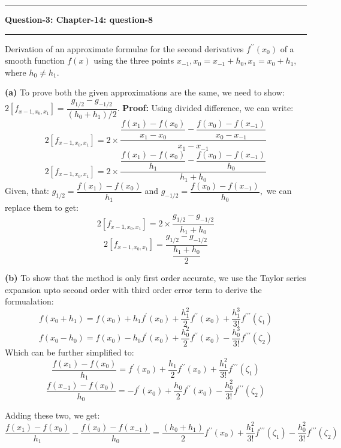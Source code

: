 \documentclass{article}
\newcommand\question[2]{\vspace{.25in}\hrule\textbf{#1: #2}\hrule\vspace{.10in}}
\renewcommand\part[1]{\vspace{.10in}\textbf{(#1)}}
\begin{document}
  \question{Question-3}{Chapter-14: question-8}
  Derivation of an approximate formulae for the second derivatives $f^{\prime\prime}(x_0)$ of a smooth function $f(x)$ using the three points $x_{-1},x_0 = x_{-1} + h_0, x_1=x_0 + h_1$, where $h_0 \neq h_1$. 

  \part{a} To prove both the given approximations are the same, we need to show: $2[f_{x-1,x_0,x_1}] = \dfrac{g_{1/2} - g_{-1/2}}{(h_0+h_1)/2}$. \newline
  \textbf {Proof:} \newline
  Using divided difference, we can write:
  \[2[f_{x-1,x_0,x_1}] = 2 \times \dfrac{\dfrac{f(x_1)-f(x_0)}{x_1 - x_0}-\dfrac{f(x_0) - f(x_{-1})}{x_0 - x_{-1}}}{x_1 - x_{-1}}\]
  \[2[f_{x-1,x_0,x_1}] = 2 \times \dfrac{\dfrac{f(x_1)-f(x_0)}{h_1}-\dfrac{f(x_0) - f(x_{-1})}{h_0}}{h_1 + h_0}\]
  Given, that: $g_{1/2} = \dfrac{f(x_1)-f(x_0)}{h_1}$ and $g_{-1/2} = \dfrac{f(x_0) - f(x_{-1})}{h_0},$ we can replace them to get:
  \[2[f_{x-1,x_0,x_1}] = 2 \times \dfrac{g_{1/2}-g_{-1/2}}{h_1 + h_0}\]
  \[2[f_{x-1,x_0,x_1}] = \dfrac{g_{1/2}-g_{-1/2}}{\dfrac{h_1 + h_0}{2}}\]

  \part{b} To show that the method is only first order accurate, we use the Taylor series expansion upto second order with third order error term to derive the formualation:\newline
  \[f(x_0 + h_1) = f(x_0) + h_1f^\prime(x_0) + \dfrac{h_1^2}{2}f^{\prime\prime}(x_0) + \dfrac{h_1^3}{3!}f^{\prime\prime\prime}(\zeta_1)\]
  \[f(x_0 - h_0) = f(x_0) - h_0f^\prime(x_0) + \dfrac{h_0^2}{2}f^{\prime\prime}(x_0) - \dfrac{h_0^3}{3!}f^{\prime\prime\prime}(\zeta_2)\]
  Which can be further simplified to:
  \[\dfrac{f(x_1) - f(x_0)}{h_1} =  f^\prime(x_0) + \dfrac{h_1}{2}f^{\prime\prime}(x_0) + \dfrac{h_1^2}{3!}f^{\prime\prime\prime}(\zeta_1)\]
  \[\dfrac{f(x_{-1}) - f(x_0)}{h_0} = -f^\prime(x_0) + \dfrac{h_0}{2}f^{\prime\prime}(x_0) - \dfrac{h_0^2}{3!}f^{\prime\prime\prime}(\zeta_2)\]

  Adding these two, we get:
  \[\dfrac{f(x_1) - f(x_0)}{h_1} - \dfrac{f(x_{0}) - f(x_{-1})}{h_0} = \dfrac{(h_0 + h_1)}{2}f^{\prime\prime}(x_0) + \dfrac{h_1^2}{3!}f^{\prime\prime\prime}(\zeta_1) - \dfrac{h_0^2}{3!}f^{\prime\prime\prime}(\zeta_2)\]
\end{document}
